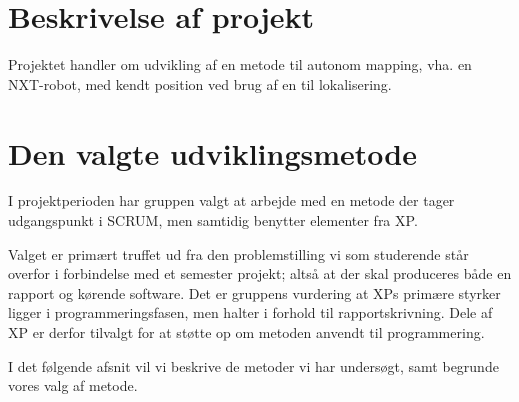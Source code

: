 \section{Beskrivelse af projekt}
Projektet handler om udvikling af en metode til autonom mapping, vha. en \legoms NXT\textregistered-robot, med kendt position ved brug af en \mskinect til lokalisering.

\section{Den valgte udviklingsmetode}\label{valgtmetode}
I projektperioden har gruppen valgt at arbejde med en metode der tager udgangspunkt i SCRUM, men samtidig benytter elementer fra XP.

Valget er primært truffet ud fra den problemstilling vi som studerende står overfor i forbindelse med et semester projekt; altså at der skal produceres både en rapport og kørende software.
Det er gruppens vurdering at XPs primære styrker ligger i programmeringsfasen, men halter i forhold til rapportskrivning.
Dele af XP er derfor tilvalgt for at støtte op om metoden anvendt til programmering.

I det følgende afsnit vil vi beskrive de metoder vi har undersøgt, samt begrunde vores valg af metode.
